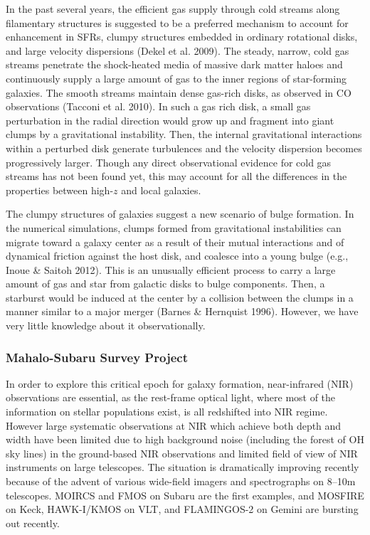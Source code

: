 In the past several years, the efficient gas supply through cold streams along 
filamentary structures is suggested to be a preferred mechanism to account for 
enhancement in SFRs, clumpy structures embedded in ordinary rotational disks, 
and large velocity dispersions (Dekel et al. 2009).
The steady, narrow, cold gas streams penetrate the shock-heated media of 
massive dark matter haloes and continuously supply a large amount of gas 
to the inner regions of star-forming galaxies. The smooth streams maintain 
dense gas-rich disks, as observed in CO observations (Tacconi et al. 2010).
In such a gas rich disk, a small gas perturbation in the radial direction would 
grow up and fragment into giant clumps by a gravitational instability.
Then, the internal gravitational interactions within a perturbed disk generate
turbulences and the velocity dispersion becomes progressively larger. 
Though any direct observational evidence for cold gas streams has not been 
found yet, this may account for all the differences in the properties between 
high-$z$ and local galaxies.

The clumpy structures of galaxies suggest a new scenario of bulge formation. 
In the numerical simulations, clumps formed from gravitational instabilities can 
migrate toward a galaxy center as a result of their mutual interactions and of 
dynamical friction against the host disk, and coalesce into a young bulge 
(e.g., Inoue \& Saitoh 2012).
This is an unusually efficient process to carry a large amount of gas and 
star from galactic disks to bulge components. Then, a starburst would be 
induced at the center by a collision between the clumps in a manner similar 
to a major merger (Barnes \& Hernquist 1996). However, we have very little 
knowledge about it observationally.

\subsubsection{Mahalo-Subaru Survey Project}

In order to explore this critical epoch for galaxy formation,
near-infrared (NIR) observations are essential,
as the rest-frame optical light, where most of the information
on stellar populations exist, is all redshifted into NIR regime. 
However large systematic observations at NIR which achieve both depth and
width have been limited due to high background noise (including the forest
of OH sky lines) in the ground-based NIR observations and limited field of
view of NIR instruments on large telescopes.
The situation is dramatically improving recently because of the advent of
various wide-field imagers and spectrographs on 8--10m telescopes.
MOIRCS and FMOS on Subaru are the first examples, and MOSFIRE on Keck, HAWK-I/KMOS
on VLT, and FLAMINGOS-2 on Gemini are bursting out recently.

